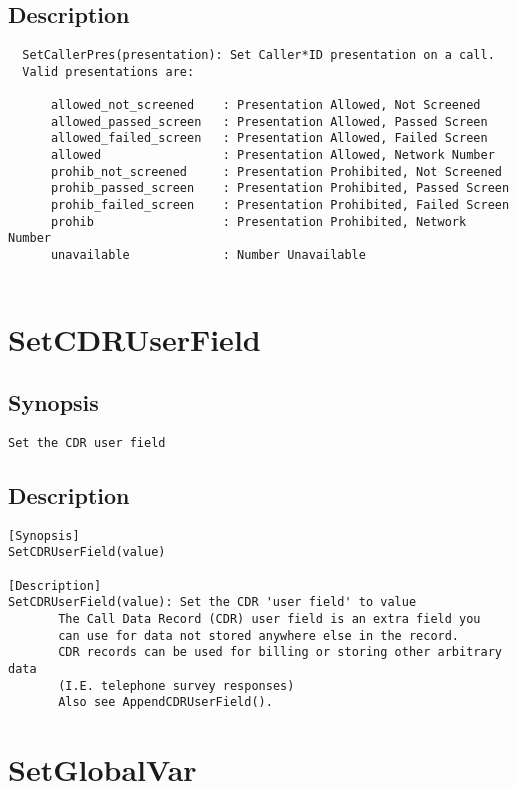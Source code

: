 \subsection{Description}
\begin{verbatim}
  SetCallerPres(presentation): Set Caller*ID presentation on a call.
  Valid presentations are:

      allowed_not_screened    : Presentation Allowed, Not Screened
      allowed_passed_screen   : Presentation Allowed, Passed Screen
      allowed_failed_screen   : Presentation Allowed, Failed Screen
      allowed                 : Presentation Allowed, Network Number
      prohib_not_screened     : Presentation Prohibited, Not Screened
      prohib_passed_screen    : Presentation Prohibited, Passed Screen
      prohib_failed_screen    : Presentation Prohibited, Failed Screen
      prohib                  : Presentation Prohibited, Network Number
      unavailable             : Number Unavailable


\end{verbatim}


\section{SetCDRUserField}
\subsection{Synopsis}
\begin{verbatim}
Set the CDR user field
\end{verbatim}
\subsection{Description}
\begin{verbatim}
[Synopsis]
SetCDRUserField(value)

[Description]
SetCDRUserField(value): Set the CDR 'user field' to value
       The Call Data Record (CDR) user field is an extra field you
       can use for data not stored anywhere else in the record.
       CDR records can be used for billing or storing other arbitrary data
       (I.E. telephone survey responses)
       Also see AppendCDRUserField().

\end{verbatim}


\section{SetGlobalVar}
